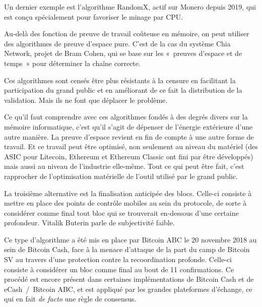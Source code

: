 Un dernier exemple est l'algorithme RandomX, actif sur Monero depuis 2019, qui est conçu spécialement pour favoriser le minage par CPU.

Au-delà des fonction de preuve de travail coûteuse en mémoire, on peut utiliser des algorithmes de preuve d'espace pure. C'est de la cas du système Chia Network, projet de Bram Cohen, qui se base sur les «~preuves d'espace et de temps~» pour déterminer la chaîne correcte.

Ces algorithmes sont censés être plus résistants à la censure en facilitant la participation du grand public et en améliorant de ce fait la distribution de la validation. Mais ils ne font que déplacer le problème.

Ce qu'il faut comprendre avec ces algorithmes fondés à des degrés divers sur la mémoire informatique, c'est qu'il s'agit de dépenser de l'énergie extérieure d'une autre manière. La preuve d'espace revient en fin de compte à une autre forme de travail. Et ce travail peut être optimisé, non seulement au niveau du matériel (des ASIC pour Litecoin, Ethereum et Ethereum Classic ont fini par être développés) mais aussi au niveau de l'industrie elle-même. Tout ce qui peut être fait, c'est rapprocher de l'optimisation matérielle de l'outil utilisé par le grand public.


La troisième alternative est la finalisation anticipée des blocs. Celle-ci consiste à mettre en place des points de contrôle mobiles au sein du protocole, de sorte à considérer comme final tout bloc qui se trouverait en-dessous d'une certaine profondeur. Vitalik Buterin parle de subjectivité faible.

Ce type d'algorithme a été mis en place par Bitcoin ABC le 20 novembre 2018 au sein de Bitcoin Cash, face à la menace d'attaque de la part du camp de Bitcoin SV au travers d'une protection contre la recoordination profonde. Celle-ci consiste à considérer un bloc comme final au bout de 11 confirmations. Ce procédé est encore présent dans certaines implémentations de Bitcoin Cash et de eCash~/~Bitcoin ABC, et est appliqué par les grandes plateformes d'échange, ce qui en fait \emph{de facto} une règle de consensus. %

